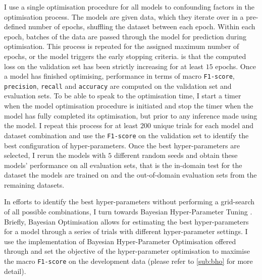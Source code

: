 I use a single optimisation procedure for all models to  confounding factors in the optimisation process.  
The models are given data, which they iterate over in a pre-defined number of epochs, shuffling the dataset between each epoch.  
Within each epoch, batches of the data  are passed through the model for prediction during optimisation.  
This process is repeated for the assigned maximum number of epochs, or  the model triggers the early stopping \citep{Prechelt:1998} criteria.   
 is that the computed loss on the validation set has been strictly increasing for at least $15$ epochs.  
Once a model has finished optimising, performance in terms of macro \texttt{F1-score}, \texttt{precision}, \texttt{recall} and \texttt{accuracy} are computed on the validation set and evaluation sets.  
To be able to speak to the optimisation time, I start a timer when the model optimisation procedure is initiated and stop the timer when the model has fully completed its optimisation, but prior to any inference made using the model.  
I repeat this process for at least $200$ unique trials for each model and dataset combination and use the \texttt{F1-score} on the validation set to identify the best configuration of hyper-parameters.  
Once the best hyper-parameters are selected, I rerun the models with $5$ different random seeds and obtain these models' performance on all evaluation sets, that is the in-domain test for the dataset the models are trained on and the out-of-domain evaluation sets from the remaining datasets.  
  
In efforts to identify the best hyper-parameters without performing a grid-search of all possible combinations, I turn towards Bayesian Hyper-Parameter Tuning \citep{Neal:1996}.  
Briefly, Bayesian Optimisation allows for estimating the best hyper-parameters for a model through a series of trials with different hyper-parameter settings.  
I use the implementation of Bayesian Hyper-Parameter Optimisation offered through \citet{Wandb} and set the objective of the hyper-parameter optimisation to maximise the macro \texttt{F1-score} on the development data (please refer to \cref{sub:bho} for more detail).  
  
